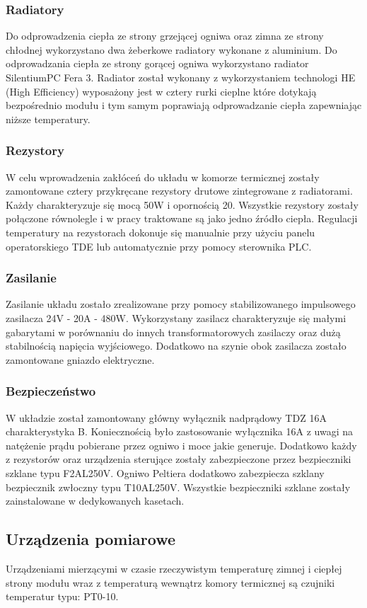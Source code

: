 \documentclass[oneside]{mgr}
\begin{document}
\subsubsection{Radiatory}
Do odprowadzenia ciepła ze strony grzejącej ogniwa oraz zimna ze strony chłodnej wykorzystano dwa żeberkowe radiatory wykonane z aluminium. Do odprowadzania ciepła ze strony gorącej ogniwa wykorzystano radiator SilentiumPC Fera 3. Radiator został wykonany z wykorzystaniem technologi HE (High Efficiency) wyposażony jest w cztery rurki cieplne które dotykają bezpośrednio modułu i tym samym poprawiają odprowadzanie ciepła zapewniając niższe temperatury.
\subsubsection{Rezystory}
W celu wprowadzenia zakłóceń do układu w komorze termicznej zostały zamontowane cztery przykręcane rezystory drutowe zintegrowane z radiatorami. Każdy charakteryzuje się mocą 50W i opornością 20\ohm. Wszystkie rezystory zostały połączone równolegle i w pracy traktowane są jako jedno źródło ciepła. Regulacji temperatury na rezystorach dokonuje się manualnie przy użyciu panelu operatorskiego TDE lub automatycznie przy pomocy sterownika PLC.
\subsubsection{Zasilanie}
Zasilanie układu zostało zrealizowane przy pomocy stabilizowanego impulsowego zasilacza 24V - 20A - 480W. Wykorzystany zasilacz charakteryzuje się małymi gabarytami w porównaniu do innych transformatorowych zasilaczy oraz  dużą stabilnością napięcia wyjściowego. Dodatkowo na szynie obok zasilacza zostało zamontowane gniazdo elektryczne.
\subsubsection{Bezpieczeństwo}
W układzie został zamontowany główny wyłącznik nadprądowy TDZ 16A charakterystyka B. Koniecznością było zastosowanie wyłącznika 16A z uwagi na natężenie prądu pobierane przez ogniwo i moce jakie generuje. Dodatkowo każdy z rezystorów oraz urządzenia sterujące zostały zabezpieczone przez  bezpieczniki szklane typu F2AL250V. Ogniwo Peltiera dodatkowo zabezpiecza szklany bezpiecznik zwłoczny typu T10AL250V. Wszystkie bezpieczniki szklane zostały zainstalowane w dedykowanych kasetach.

\subsection{Urządzenia pomiarowe}
Urządzeniami mierzącymi w czasie rzeczywistym temperaturę zimnej i ciepłej strony modułu wraz z temperaturą wewnątrz komory termicznej są czujniki temperatur typu: PT0-10. 
\end{document}
